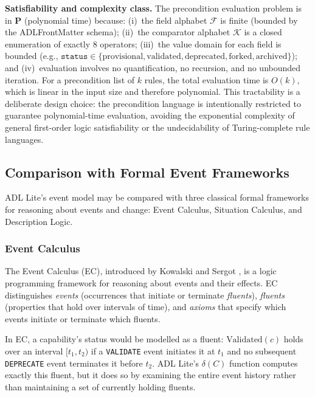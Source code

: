 \textbf{Satisfiability and complexity class.} The precondition evaluation problem is in \textbf{P} (polynomial time) because: (i)~the field alphabet $\mathcal{F}$ is finite (bounded by the ADLFrontMatter schema); (ii)~the comparator alphabet $\mathcal{K}$ is a closed enumeration of exactly 8 operators; (iii)~the value domain for each field is bounded (e.g., $\texttt{status} \in \{\text{provisional}, \text{validated}, \text{deprecated}, \text{forked}, \text{archived}\}$); and (iv)~evaluation involves no quantification, no recursion, and no unbounded iteration. For a precondition list of $k$ rules, the total evaluation time is $O(k)$, which is linear in the input size and therefore polynomial. This tractability is a deliberate design choice: the precondition language is intentionally restricted to guarantee polynomial-time evaluation, avoiding the exponential complexity of general first-order logic satisfiability or the undecidability of Turing-complete rule languages.

\subsection{Comparison with Formal Event Frameworks}

ADL Lite's event model may be compared with three classical formal frameworks for reasoning about events and change: Event Calculus, Situation Calculus, and Description Logic.

\subsubsection{Event Calculus}

The Event Calculus (EC), introduced by Kowalski and Sergot \cite{event_calculus}, is a logic programming framework for reasoning about events and their effects. EC distinguishes \emph{events} (occurrences that initiate or terminate \emph{fluents}), \emph{fluents} (properties that hold over intervals of time), and \emph{axioms} that specify which events initiate or terminate which fluents.

In EC, a capability's status would be modelled as a fluent: $\text{Validated}(c)$ holds over an interval $[t_1, t_2)$ if a \texttt{VALIDATE} event initiates it at $t_1$ and no subsequent \texttt{DEPRECATE} event terminates it before $t_2$. ADL Lite's $\delta(C)$ function computes exactly this fluent, but it does so by examining the entire event history rather than maintaining a set of currently holding fluents.

